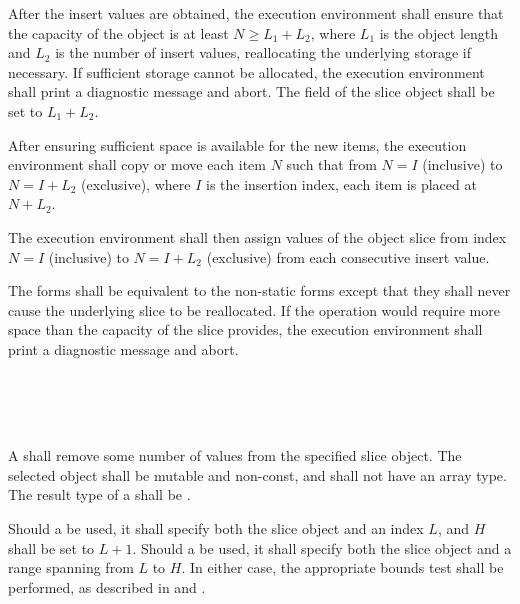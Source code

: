 \specsubsubitem
After the insert values are obtained, the execution environment shall ensure
that the capacity of the object is at least $N \geq L_1 + L_2$, where $L_1$ is
the object length and $L_2$ is the number of insert values, reallocating the
underlying storage if necessary. If sufficient storage cannot be allocated, the
execution environment shall print a diagnostic message and abort. The
 field of the slice object shall be set to $L_1 + L_2$.

\specsubsubitem
After ensuring sufficient space is available for the new items, the execution
environment shall copy or move each item $N$ such that from $N=I$ (inclusive)
to $N=I+L_2$ (exclusive), where $I$ is the insertion index, each item is placed
at $N+L_2$.

\specsubsubitem
The execution environment shall then assign values of the object slice from
index $N = I$ (inclusive) to $N = I+L_2$ (exclusive) from each consecutive
insert value.

\specsubsubitem
The  forms shall be equivalent to the non-static forms except
that they shall never cause the underlying slice to be reallocated. If the
operation would require more space than the capacity of the slice provides, the
execution environment shall print a diagnostic message and abort.


\begin{grammar}
 \\
	  \terminal{(}  \terminal{)} \\
	  \terminal{(}  \terminal{)} \\
\end{grammar}

\specsubsubitem
A  shall remove some number of values from the
specified slice object. The selected object shall be mutable and non-const, and
shall not have an array type. The result type of a
 shall be .

\specsubsubitem
Should a  be used, it shall specify both the
slice object and an index $L$, and $H$ shall be set to $L+1$. Should a
 be used, it shall specify both the slice object
and a range spanning from $L$ to $H$. In either case, the appropriate bounds
test shall be performed, as described in  and
.

